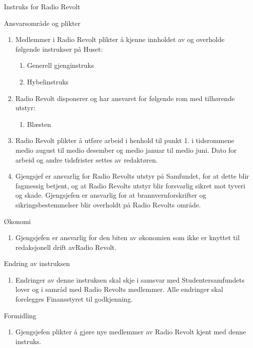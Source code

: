\documentclass[../../fsbok.tex]{subfiles}
\begin{document}
\begin{instruks*}{Instruks for Radio Revolt}
    
    \begin{instruksledd}{Ansvarsområde og plikter}
        \begin{enumerate}   
            \item  Medlemmer i Radio Revolt plikter å kjenne innholdet av og overholde følgende
                instrukser på Huset:
                \begin{enumerate}
                    \item Generell gjenginstruks
			\item Hybelinstruks
                \end{enumerate}
            \item Radio Revolt disponerer og har ansvaret for følgende rom med tilhørende utstyr:
                \begin{enumerate}
                    \item Blæsten
                \end{enumerate}
            \item Radio Revolt plikter å utføre arbeid i henhold til punkt 1. i tidsrommene
                medio august til medio desember og medio januar til medio juni. Dato for arbeid og andre tidsfrister
                settes av redaktøren.
            \item Gjengsjef er ansvarlig for Radio Revolts utstyr på Samfundet, for at dette blir
fagmessig betjent, og at Radio Revolts utstyr blir forsvarlig sikret mot tyveri og skade.
Gjengsjefen er ansvarlig for at brannvernforskrifter og sikringsbestemmelser blir
overholdt på Radio Revolts område.
        \end{enumerate}
    \end{instruksledd}


    \begin{instruksledd}{Økonomi}
        \begin{enumerate}
            \item Gjengsjefen er ansvarlig for den biten av økonomien som ikke er knyttet til
                redaksjonell drift avRadio Revolt.
        \end{enumerate}
    \end{instruksledd}
    
    \begin{instruksledd}{Endring av instruksen}
        \begin{enumerate}
            \item Endringer av denne instruksen skal skje i samsvar med Studentersamfundets lover og
i samråd med Radio Revolts medlemmer. Alle endringer skal forelegges Finansstyret
til godkjenning.
        \end{enumerate}
    \end{instruksledd}
    
    \begin{instruksledd}{Formidling}
        \begin{enumerate}
            \item Gjengsjefen plikter å gjøre nye medlemmer av Radio Revolt kjent med denne
                instruks.
        \end{enumerate}
    \end{instruksledd}

\end{instruks*}
\end{document}
